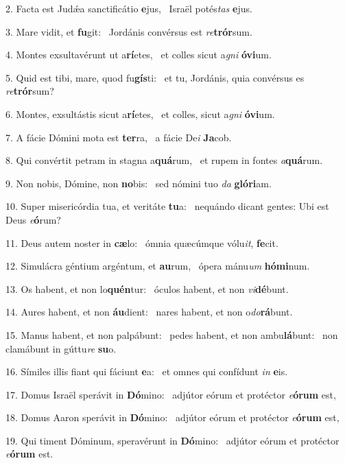 2. Facta est Judǽa sanctificátio \textbf{e}jus, \ast\  Israël potés\textit{tas} \textbf{e}jus.\

3. Mare vidit, et \textbf{fu}git: \ast\  Jordánis convérsus est \textit{re}\textbf{trór}sum.\

4. Montes exsultavérunt ut a\textbf{rí}etes, \ast\  et colles sicut a\textit{gni} \textbf{ó}\textbf{vi}um.\

5. Quid est tibi, mare, quod fu\textbf{gís}ti: \ast\  et tu, Jordánis, quia convérsus es \textit{re}\textbf{trór}sum?\

6. Montes, exsultástis sicut a\textbf{rí}etes, \ast\  et colles, sicut a\textit{gni} \textbf{ó}\textbf{vi}um.\

7. A fácie Dómini mota est \textbf{ter}ra, \ast\  a fácie De\textit{i} \textbf{Ja}cob.\

8. Qui convértit petram in stagna a\textbf{quá}rum, \ast\  et rupem in fontes \textit{a}\textbf{quá}rum.\

9. Non nobis, Dómine, non \textbf{no}bis: \ast\  sed nómini tuo \textit{da} \textbf{gló}\textbf{ri}am.\

10. Super misericórdia tua, et veritáte \textbf{tu}a: \ast\  nequándo dicant gentes: Ubi est Deus \textit{e}\textbf{ó}rum?\

11. Deus autem noster in \textbf{cæ}lo: \ast\  ómnia quæcúmque vólu\textit{it}, \textbf{fe}cit.\

12. Simulácra géntium argéntum, et \textbf{au}rum, \ast\  ópera mánu\textit{um} \textbf{hó}\textbf{mi}num.\

13. Os habent, et non lo\textbf{quén}tur: \ast\  óculos habent, et non \textit{vi}\textbf{dé}bunt.\

14. Aures habent, et non \textbf{áu}dient: \ast\  nares habent, et non o\textit{do}\textbf{rá}bunt.\

15. Manus habent, et non palpábunt: \dag\  pedes habent, et non ambu\textbf{lá}bunt: \ast\  non clamábunt in gúttu\textit{re} \textbf{su}o.\

16. Símiles illis fiant qui fáciunt \textbf{e}a: \ast\  et omnes qui confídunt \textit{in} \textbf{e}is.\

17. Domus Israël sperávit in \textbf{Dó}mino: \ast\  adjútor eórum et protéctor \textit{e}\textbf{ó}\textbf{rum} est,\

18. Domus Aaron sperávit in \textbf{Dó}mino: \ast\  adjútor eórum et protéctor \textit{e}\textbf{ó}\textbf{rum} est,\

19. Qui timent Dóminum, speravérunt in \textbf{Dó}mino: \ast\  adjútor eórum et protéctor \textit{e}\textbf{ó}\textbf{rum} est.\

